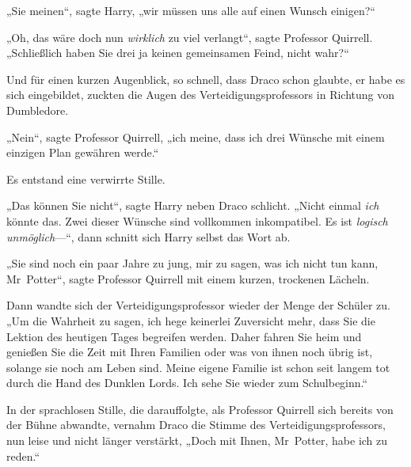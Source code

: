 „Sie meinen“, sagte Harry, „wir müssen uns alle auf einen Wunsch einigen?“

„Oh, das wäre doch nun \emph{wirklich} zu viel verlangt“, sagte Professor Quirrell. „Schließlich haben Sie drei ja keinen gemeinsamen Feind, nicht wahr?“

Und für einen kurzen Augenblick, so schnell, dass Draco schon glaubte, er habe es sich eingebildet, zuckten die Augen des Verteidigungsprofessors in Richtung von Dumbledore.

„Nein“, sagte Professor Quirrell, „ich meine, dass ich drei Wünsche mit einem einzigen Plan gewähren werde.“

Es entstand eine verwirrte Stille.

„Das können Sie nicht“, sagte Harry neben Draco schlicht. „Nicht einmal \emph{ich} könnte das. Zwei dieser Wünsche sind vollkommen inkompatibel. Es ist \emph{logisch unmöglich}—“, dann schnitt sich Harry selbst das Wort ab.

„Sie sind noch ein paar Jahre zu jung, mir zu sagen, was ich nicht tun kann, Mr~Potter“, sagte Professor Quirrell mit einem kurzen, trockenen Lächeln.

Dann wandte sich der Verteidigungsprofessor wieder der Menge der Schüler zu. „Um die Wahrheit zu sagen, ich hege keinerlei Zuversicht mehr, dass Sie die Lektion des heutigen Tages begreifen werden. Daher fahren Sie heim und genießen Sie die Zeit mit Ihren Familien oder was von ihnen noch übrig ist, solange sie noch am Leben sind. Meine eigene Familie ist schon seit langem tot durch die Hand des Dunklen Lords. Ich sehe Sie wieder zum Schulbeginn.“

In der sprachlosen Stille, die darauffolgte, als Professor Quirrell sich bereits von der Bühne abwandte, vernahm Draco die Stimme des Verteidigungsprofessors, nun leise und nicht länger verstärkt, „Doch mit Ihnen, Mr~Potter, habe ich zu reden.“

